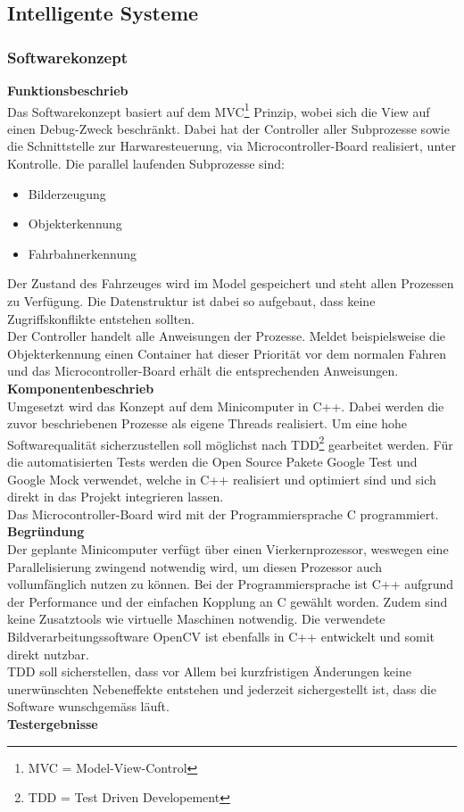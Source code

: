 \subsection{Intelligente Systeme}

\subsubsection{Softwarekonzept}
\textbf{Funktionsbeschrieb}\\[0.2cm]
Das Softwarekonzept basiert auf dem MVC\footnote{MVC = Model-View-Control} Prinzip, wobei sich die View auf einen Debug-Zweck beschränkt. Dabei hat der Controller aller Subprozesse sowie die Schnittstelle zur Harwaresteuerung, via Microcontroller-Board realisiert, unter Kontrolle. Die parallel laufenden  Subprozesse sind:
\begin{itemize}
\item Bilderzeugung
\item Objekterkennung
\item Fahrbahnerkennung
\end{itemize}
Der Zustand des Fahrzeuges wird im Model gespeichert und steht allen Prozessen zu Verfügung. Die Datenstruktur ist dabei so aufgebaut, dass keine Zugriffskonflikte entstehen sollten.\\
Der Controller handelt alle Anweisungen der Prozesse. Meldet beispielsweise die Objekterkennung einen Container hat dieser Priorität vor dem normalen Fahren und das Microcontroller-Board erhält die entsprechenden Anweisungen.\\[0.2cm]
\textbf{Komponentenbeschrieb}\\[0.2cm]
Umgesetzt wird das Konzept auf dem Minicomputer in C++. Dabei werden die zuvor beschriebenen Prozesse als eigene Threads realisiert. Um eine hohe Softwarequalität sicherzustellen soll möglichst nach TDD\footnote{TDD = Test Driven Developement} gearbeitet werden. Für die automatisierten Tests werden die Open Source Pakete Google Test und Google Mock verwendet, welche in C++ realisiert und optimiert sind und sich direkt in das Projekt integrieren lassen.\\
Das Microcontroller-Board wird mit der Programmiersprache C programmiert.\\[0.2cm]
\textbf{Begründung}\\[0.2cm]
Der geplante Minicomputer verfügt über einen Vierkernprozessor, weswegen eine Parallelisierung zwingend notwendig wird, um diesen Prozessor auch vollumfänglich nutzen zu können. Bei der Programmiersprache ist C++ aufgrund der Performance und der einfachen Kopplung an C gewählt worden. Zudem sind keine Zusatztools wie virtuelle Maschinen notwendig. Die verwendete Bildverarbeitungssoftware OpenCV ist ebenfalls in C++ entwickelt und somit direkt nutzbar.\\
TDD soll sicherstellen, dass vor Allem bei kurzfristigen Änderungen keine unerwünschten Nebeneffekte entstehen und jederzeit sichergestellt ist, dass die Software wunschgemäss läuft.\\[0.2cm]
\textbf{Testergebnisse}\\[0.2cm]


